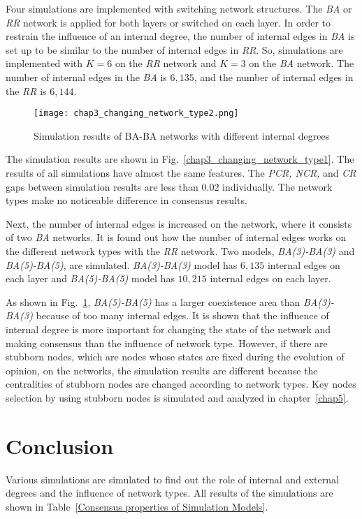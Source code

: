 Four simulations are implemented with switching network structures. The \textit{BA} or \textit{RR} network is applied for both layers or switched on each layer. In order to restrain the influence of an internal degree, the number of internal edges in \textit{BA} is set up to be similar to the number of internal edges in \textit{RR}. So, simulations are implemented with $K=6$ on the \textit{RR} network and $K=3$ on the \textit{BA} network. The number of internal edges in the \textit{BA} is $6,135$, and the number of internal edges in the \textit{RR} is $6,144$.

\begin{figure}[!htb]
	\centering
	\texttt{[image: chap3\_changing\_network\_type2.png]}
	\caption{Simulation results of BA-BA networks with different internal degrees}
	\label{chap3_changing_network_type2}
\end{figure}

The simulation results are shown in Fig.~\ref{chap3_changing_network_type1}. The results of all simulations have almost the same features. The \textit{PCR, NCR,} and \textit{CR} gaps between simulation results are less than $0.02$ individually. The network types make no noticeable difference in consensus results. 

Next, the number of internal edges is increased on the network, where it consists of two \textit{BA} networks. It is found out how the number of internal edges works on the different network types with the \textit{RR} network. Two models, \textit{BA(3)-BA(3)} and \textit{BA(5)-BA(5)}, are simulated. \textit{BA(3)-BA(3)} model has $6,135$ internal edges on each layer and \textit{BA(5)-BA(5)} model has $10,215$ internal edges on each layer.

As shown in Fig.~\ref{chap3_changing_network_type2}, \textit{BA(5)-BA(5)} has a larger coexistence area than \textit{BA(3)-BA(3)} because of too many internal edges. It is shown that the influence of internal degree is more important for changing the state of the network and making consensus than the influence of network type. However, if there are stubborn nodes, which are nodes whose states are fixed during the evolution of opinion, on the networks, the simulation results are different because the centralities of stubborn nodes are changed according to network types. Key nodes selection by using stubborn nodes is simulated and analyzed in chapter~\ref{chap5}.\\

\section{Conclusion}
Various simulations are simulated to find out the role of internal and external degrees and the influence of network types. All results of the simulations are shown in Table~\ref{Consensus properties of Simulation Models}.
 
